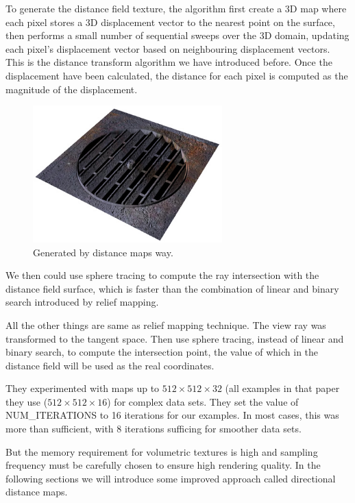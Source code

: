 To generate the distance field texture, the algorithm first create a 3D map where each pixel stores a 3D displacement vector to the nearest point on the surface, then performs a small number of sequential sweeps over the 3D domain, updating each pixel's displacement vector based on neighbouring displacement vectors. This is the distance transform algorithm we have introduced before. Once the displacement have been calculated, the distance for each pixel is computed as the magnitude of the displacement.

\begin{figure}
\sidecaption
	\includegraphics[width=0.65\textwidth]{graphics/df/08_displacement_06}
	\caption{Generated by distance maps way.}
\end{figure}

We then could use sphere tracing to compute the ray intersection with the distance field surface, which is faster than the combination of linear and binary search introduced by relief mapping. 

All the other things are same as relief mapping technique. The view ray was transformed to the tangent space. Then use sphere tracing, instead of linear and binary search, to compute the intersection point, the value of which in the distance field will be used as the real coordinates.

They experimented with maps up to $512\times512\times32$ (all examples in that paper they use ($512\times512\times16$) for complex data sets. They set the value of NUM\_ITERATIONS to 16 iterations for our examples. In most cases, this was more than sufficient, with 8 iterations sufficing for smoother data sets.

But the memory requirement for volumetric textures is high and sampling frequency must be carefully chosen to ensure high rendering quality. In the following sections we will introduce some improved approach called directional distance maps.

